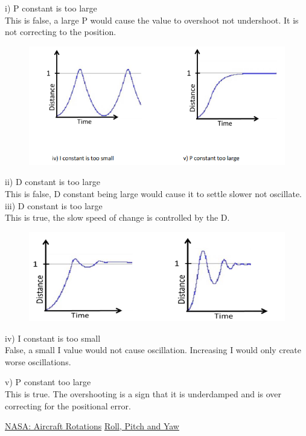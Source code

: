 \documentclass[10pt,a4paper]{article}
\begin{document}
i) P constant is too large\\

This is false, a large P would cause the value to overshoot not undershoot. It is not correcting to the position.\\


\begin{figure}[H]
\centering
\includegraphics[width=5in]{images/Problem2-2.png} \\
\end{figure}

ii) D constant is too large\\

This is false, D constant being large would cause it to settle slower not oscillate.\\

iii) D constant is too large\\

This is true, the slow speed of change is controlled by the D.\\

\begin{figure}[H]
\centering
\includegraphics[width=5in]{images/Problem2-3.png} \\
\end{figure}

iv) I constant is too small \\
False, a small I value would not cause oscillation. Increasing I would only create worse oscillations.

v) P constant too large\\
This is true. The overshooting is a sign that it is underdamped and is over correcting for the positional error.
\begin{thebibliography}{9}

\href{https://www1.grc.nasa.gov/beginners-guide-to-aeronautics/aircraft-rotations/}{NASA: Aircraft Rotations}
\href{https://xmarklabs.com/blog/2017/08/mysteries-tracking/rollpitchyaw/}{Roll, Pitch and Yaw}

\end{thebibliography}
\end{document}
